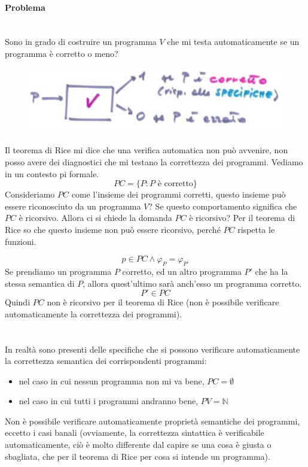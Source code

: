 \documentclass{article}
\begin{document}
\paragraph{Problema}\mbox{}\\
Sono in grado di costruire un programma $V$ che mi testa automaticamente se un
programma è corretto o meno?
\begin{figure}[H]
    \centering
    \includegraphics[scale=0.6]{images/programma_V.png}
\end{figure}
Il teorema di Rice mi dice che una verifica automatica non può avvenire, non posso
avere dei diagnostici che mi testano la correttezza dei programmi. Vediamo in un contesto
pi formale.
$$PC=\{P:P\text{ è corretto}\}$$
Consideriamo $PC$ come l'insieme dei programmi corretti, questo insieme può essere riconosciuto
da un programma $V$? Se questo comportamento significa che $PC$ è ricorsivo. Allora ci si chiede
la domanda $PC$ è ricorsivo? Per il teorema di Rice so che questo insieme non può essere
ricorsivo, perché $PC$ rispetta le funzioni.

$$p\in PC \land \varphi_P = \varphi_{P'}$$
Se prendiamo un programma $P$ corretto, ed un altro programma $P'$ che ha la stessa semantica
di $P$, allora quest'ultimo sarà anch'esso un programma corretto.
$$P'\in PC$$
Quindi $PC$ non è ricorsivo per il teorema di Rice (non è possibile verificare automaticamente
la correttezza dei programmi).

\paragraph{}\mbox{}\\
In realtà sono presenti delle specifiche che si possono verificare automaticamente
la correttezza semantica dei corrispondenti programmi:
\begin{itemize}
    \item nel caso in cui nessun programma non mi va bene, $PC=\emptyset$
    \item nel caso in cui tutti i programmi andranno bene, $PV=\mathbb{N}$
\end{itemize}
Non è possibile verificare automaticamente proprietà semantiche dei programmi, eccetto
i casi banali (ovviamente, la correttezza sintattica è verificabile automaticamente,
ciò è molto differente dal capire se una cosa è giusta o sbagliata, che per il
teorema di Rice per cosa si intende un programma).
\end{document}
